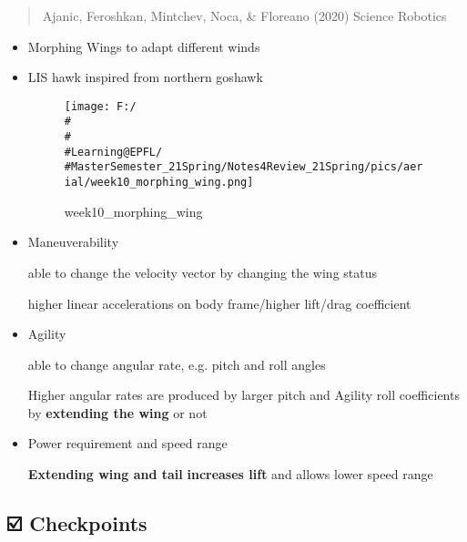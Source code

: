 \documentclass[]{article}
\begin{document}
\begin{quote}
Ajanic, Feroshkan, Mintchev, Noca, \& Floreano (2020) Science Robotics
\end{quote}

\begin{itemize}
\item
  Morphing Wings to adapt different winds
\item
  LIS hawk inspired from northern goshawk

  \begin{figure}
  \centering
  \texttt{[image: F:/\\\#\\\#\\\#Learning@EPFL/\\\#MasterSemester\_21Spring/Notes4Review\_21Spring/pics/aerial/week10\_morphing\_wing.png]}
  \caption{week10\_morphing\_wing}
  \end{figure}
\item
  Maneuverability

  able to change the velocity vector by changing the wing status

  higher linear accelerations on body frame/higher lift/drag coefficient
\item
  Agility

  able to change angular rate, e.g. pitch and roll angles

  Higher angular rates are produced by larger pitch and Agility roll
  coefficients by \textbf{extending the wing} or not
\item
  Power requirement and speed range

  \textbf{Extending wing and tail} \textbf{increases lift} and allows
  lower speed range
\end{itemize}

\subsection{☑️ Checkpoints}\label{header-n2572}
\end{document}
